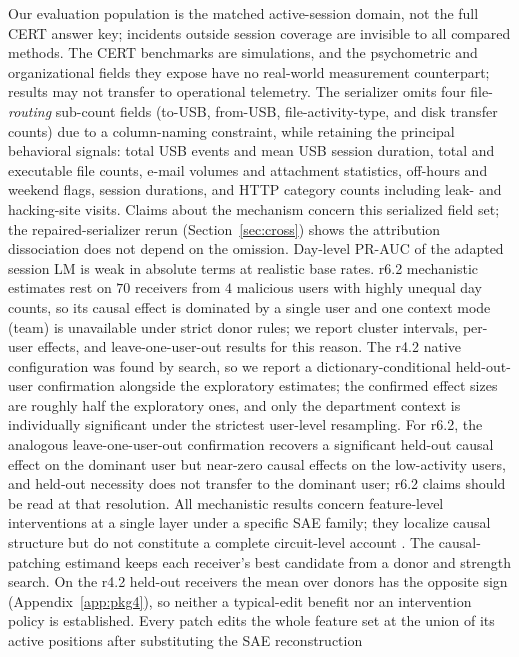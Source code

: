 \documentclass[10pt]{article} %
\newcommand{\rsix}{r6.2}
\newcommand{\rfour}{r4.2}
\begin{document}
Our evaluation population is the matched active-session domain, not the full
CERT answer key; incidents outside session coverage are invisible to all
compared methods. The CERT benchmarks are simulations, and the psychometric and
organizational fields they expose have no real-world measurement counterpart;
results may not transfer to operational telemetry. The serializer omits four file-\emph{routing} sub-count fields
(to-USB, from-USB, file-activity-type, and disk transfer counts) due to a
column-naming constraint, while retaining the principal behavioral signals:
total USB events and mean USB session duration, total and executable file
counts, e-mail volumes and attachment statistics, off-hours and weekend
flags, session durations, and HTTP category counts including leak- and
hacking-site visits. Claims about the mechanism concern this serialized field
set; the repaired-serializer rerun (Section~\ref{sec:cross}) shows the
attribution dissociation does not depend on the omission. Day-level PR-AUC of the adapted session LM
is weak in absolute terms at realistic base rates. \rsix{} mechanistic
estimates rest on $70$ receivers from $4$ malicious users with highly unequal
day counts, so its causal effect is dominated by a single user and one context
mode (team) is unavailable under strict donor rules; we report cluster
intervals, per-user effects, and leave-one-user-out results for this reason.
The \rfour{} native configuration was found by search, so we report a
dictionary-conditional held-out-user confirmation alongside the exploratory estimates; the confirmed
effect sizes are roughly half the exploratory ones, and only the department
context is individually significant under the strictest user-level resampling.
For \rsix{}, the analogous leave-one-user-out confirmation recovers a
significant held-out causal effect on the dominant user but near-zero causal
effects on the low-activity users, and held-out necessity does not transfer
to the dominant user; \rsix{} claims should be read at that resolution. All mechanistic results
concern feature-level interventions at a single layer under a specific SAE
family; they localize causal structure but do not constitute a complete
circuit-level account \citep{chan2022causal}. The causal-patching estimand
keeps each receiver's best candidate from a donor and strength search. On the
\rfour{} held-out receivers the mean over donors has the opposite sign
(Appendix~\ref{app:pkg4}), so neither a typical-edit benefit nor an
intervention policy is established. Every patch edits the whole feature set at
the union of its active positions after substituting the SAE reconstruction
\end{document}
